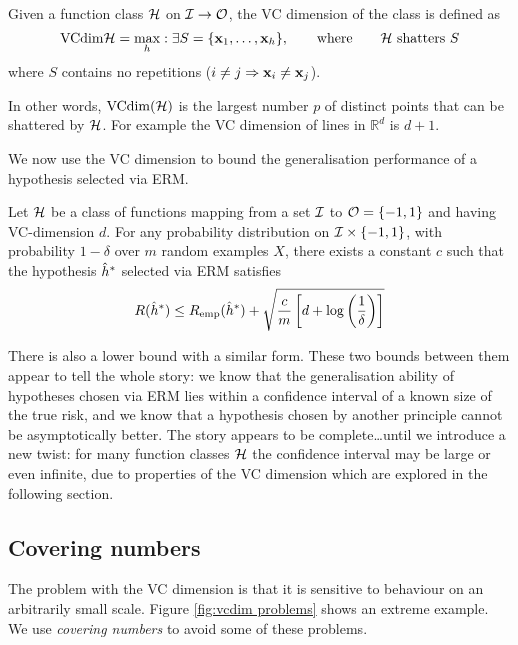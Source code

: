 \begin{definition}[VC dimension]
\label{thm:vcdim bound}
Given a function class $\mathcal{H}$ on $\mathcal{I} \rightarrow \mathcal{O}$, the VC
dimension of the class is defined as
%
\begin{equation}
\mathrm{VCdim}{\mathcal{H}} = \max_{h} : \exists S = \{\mathbf{x}_1, \ldots, \mathbf{x}_h\},
\qquad \mbox{where} \qquad \mbox{\ensuremath{\mathcal{H}}\ shatters $S$}
\end{equation}
%
where $S$ contains no repetitions ($i \neq j \Rightarrow \mathbf{x}_i \neq
\mathbf{x}_j$).
\end{definition}

In other words, $\mathrm{VCdim}(\mathcal{H})$ is the largest number $p$ of distinct
points that can be shattered by $\mathcal{H}$.  For example the VC dimension
of lines in $\mathbb{R}^d$ is $d+1$.

We now use the VC dimension to bound the generalisation performance of
a hypothesis selected via ERM.

\begin{theorem}
Let $\mathcal{H}$ be a class of functions mapping from a set $\mathcal{I}$ to $\mathcal{O} =
\{-1, 1\}$ and having VC-dimension $d$.  For any probability
distribution on $\mathcal{I} \times \{-1,1\}$, with probability $1-\delta$
over $m$ random examples $X$, there exists a constant $c$ such that
the hypothesis $\hat{h}^{\ast}$ selected via ERM satisfies
\begin{equation}
R(\hat{h}^{\ast}) \leq R_{\mathrm{emp}}(\hat{h}^{\ast}) + \sqrt{ \frac{c}{m} \left[ d
+ \log \left ( \frac{1}{\delta} \right) \right] }
\end{equation}
\end{theorem}

There is also a lower bound with a similar form.  These two bounds
between them appear to tell the whole story: we know that the
generalisation ability of hypotheses chosen via ERM lies within a
confidence interval of a known size of the true risk, and we know that
a hypothesis chosen by another principle cannot be asymptotically
better.  The story appears to be complete\ldots until we introduce a
new twist: for many function classes $\mathcal{H}$ the confidence interval
may be large or even infinite, due to properties of the VC dimension
which are explored in the following section. 

\subsection{Covering numbers}
\label{sec:covering numbers}

The problem with the VC dimension is that it is sensitive to behaviour
on an arbitrarily small scale.  Figure \ref{fig:vcdim problems} shows
an extreme example.  We use \emph{covering numbers} to avoid some of
these problems.

